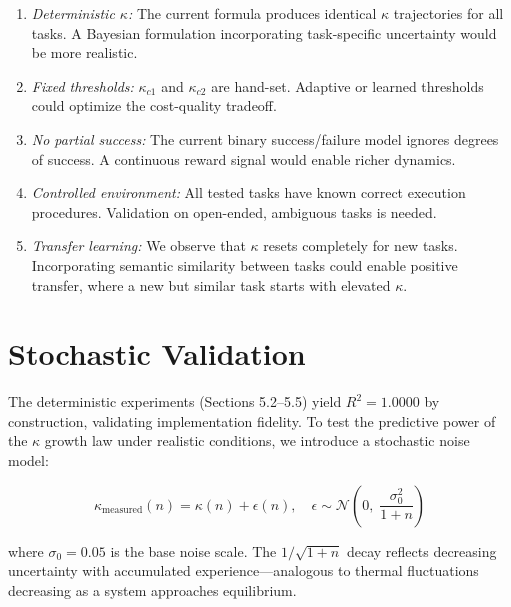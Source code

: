 \documentclass[10pt,twocolumn]{article}
\newcommand{\kap}{\kappa}
\begin{document}
\begin{enumerate}[leftmargin=*, itemsep=2pt]
  \item \textit{Deterministic $\kap$:} The current formula 
    produces identical $\kap$ trajectories for all tasks. 
    A Bayesian formulation incorporating task-specific 
    uncertainty would be more realistic.
    
  \item \textit{Fixed thresholds:} $\kap_{c1}$ and 
    $\kap_{c2}$ are hand-set. Adaptive or learned thresholds 
    could optimize the cost-quality tradeoff.
    
  \item \textit{No partial success:} The current binary 
    success/failure model ignores degrees of success. A 
    continuous reward signal would enable richer dynamics.
    
  \item \textit{Controlled environment:} All tested tasks 
    have known correct execution procedures. Validation on 
    open-ended, ambiguous tasks is needed.
    
  \item \textit{Transfer learning:} We observe that $\kap$ 
    resets completely for new tasks. Incorporating semantic 
    similarity between tasks could enable positive transfer, 
    where a new but similar task starts with elevated $\kap$.
\end{enumerate}

\section{Stochastic Validation}
\label{sec:stochastic}

The deterministic experiments (Sections 5.2--5.5) yield 
$R^2 = 1.0000$ by construction, validating implementation 
fidelity. To test the predictive power of the $\kappa$ 
growth law under realistic conditions, we introduce a 
stochastic noise model: 

\begin{equation} 
  \kappa_{\text{measured}}(n) = \kappa(n) + \epsilon(n), \quad 
  \epsilon \sim \mathcal{N}\!\left(0,\;\frac{\sigma_0^2}{1+n}\right) 
  \label{eq:noise} 
\end{equation} 

\noindent where $\sigma_0 = 0.05$ is the base noise scale. 
The $1/\sqrt{1+n}$ decay reflects decreasing uncertainty 
with accumulated experience---analogous to thermal 
fluctuations decreasing as a system approaches equilibrium. 
\end{document}
